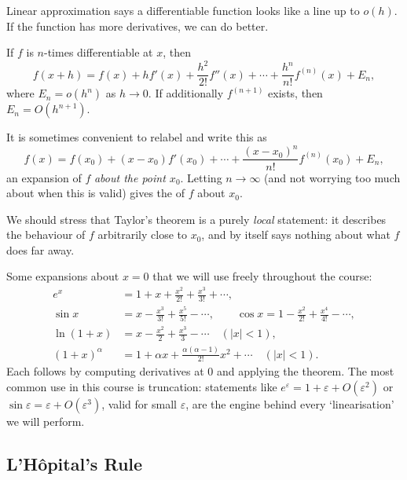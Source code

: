 \documentclass[a4paper]{scrartcl}
\begin{document}
Linear approximation says a differentiable function looks like a line up to $o(h)$. If the function has more derivatives, we can do better.

\begin{theorem}
	If $f$ is $n$-times differentiable at $x$, then
	$$
	f(x + h) = f(x) + h f'(x) + \frac{h^2}{2!} f''(x) + \cdots + \frac{h^n}{n!} f^{(n)}(x) + E_n,
	$$
	where $E_n = o(h^n)$ as $h \to 0$. If additionally $f^{(n + 1)}$ exists, then $E_n = O(h^{n + 1})$.
\end{theorem}

It is sometimes convenient to relabel and write this as
$$
f(x) = f(x_0) + (x - x_0) f'(x_0) + \cdots + \frac{(x - x_0)^n}{n!} f^{(n)}(x_0) + E_n,
$$
an expansion of $f$ \emph{about the point $x_0$}. Letting $n \to \infty$ (and not worrying too much about when this is valid) gives the  of $f$ about $x_0$.

We should stress that Taylor's theorem is a purely \emph{local} statement: it describes the behaviour of $f$ arbitrarily close to $x_0$, and by itself says nothing about what $f$ does far away.

\begin{example}
	Some expansions about $x = 0$ that we will use freely throughout the course:
	\begin{align*}
		e^x &= 1 + x + \frac{x^2}{2!} + \frac{x^3}{3!} + \cdots, \\
		\sin x &= x - \frac{x^3}{3!} + \frac{x^5}{5!} - \cdots, \qquad \cos x = 1 - \frac{x^2}{2!} + \frac{x^4}{4!} - \cdots, \\
		\ln(1 + x) &= x - \frac{x^2}{2} + \frac{x^3}{3} - \cdots \quad (|x| < 1), \\
		(1 + x)^\alpha &= 1 + \alpha x + \frac{\alpha(\alpha - 1)}{2!}x^2 + \cdots \quad (|x| < 1).
	\end{align*}
	Each follows by computing derivatives at $0$ and applying the theorem. The most common use in this course is truncation: statements like $e^\varepsilon = 1 + \varepsilon + O(\varepsilon^2)$ or $\sin\varepsilon = \varepsilon + O(\varepsilon^3)$, valid for small $\varepsilon$, are the engine behind every `linearisation' we will perform.
\end{example}

\subsection{L'H\^opital's Rule}
\end{document}
